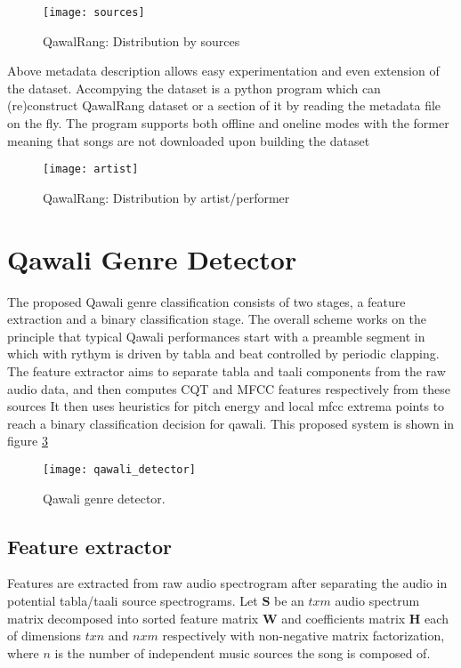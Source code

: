 \documentclass{article}
\begin{document}
\begin{figure}[htbp]
  \centering
  \texttt{[image: sources]}
  \caption{QawalRang: Distribution by sources}
\label{fig:src_dist}
\end{figure}
Above metadata description allows easy experimentation and even extension of the dataset. Accompying the dataset is a python program which can (re)construct QawalRang dataset or a section of it by reading the metadata file on the fly. The program supports both offline and oneline modes with the former meaning that songs are not downloaded upon building the dataset
\begin{figure}[htbp]
  \centering
  \texttt{[image: artist]}
  \caption{QawalRang: Distribution by artist/performer}
\label{fig:author_dist}
\end{figure}

\section{Qawali Genre Detector}\label{sec:detector}

The proposed Qawali genre classification consists of two stages, a feature extraction and a binary classification stage. The overall scheme works on the principle that typical Qawali performances start with a preamble segment in which with rythym is driven by tabla and beat controlled by periodic clapping. The feature extractor aims to separate tabla and taali components from the raw audio data, and then computes CQT and MFCC features respectively from these sources It then uses heuristics for pitch energy and local mfcc extrema points to reach a binary classification decision for qawali. This proposed system is shown in figure \ref{fig:figure}
\begin{figure}[htbp]
  \centering
  \texttt{[image: qawali\_detector]}
  \caption{Qawali genre detector.}
\label{fig:figure}
\end{figure}

\subsection{Feature extractor}
Features are extracted from raw audio spectrogram after separating the audio in potential tabla/taali source spectrograms. Let $\boldsymbol{S}$ be an $txm$ audio spectrum matrix decomposed into sorted feature matrix $\boldsymbol{W}$ and coefficients matrix $\boldsymbol{H}$ each of dimensions $txn$ and $nxm$ respectively with non-negative matrix factorization, where $n$ is the number of independent music sources the song is composed of.
\end{document}
